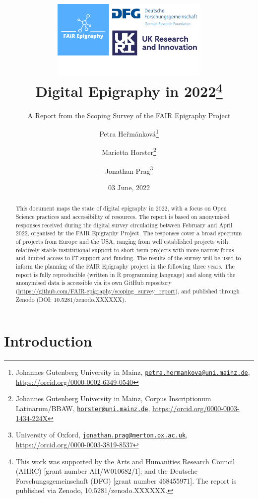 \documentclass[
  12pt,
]{scrreprt}
\title{\includegraphics[width=3in,height=\textheight]{../assets/banner.png}\\
Digital Epigraphy in 2022\footnote{This work was supported by the Arts
  and Humanities Research Council (AHRC) {[}grant number
  AH/W010682/1{]}; and the Deutsche Forschungsgemeinschaft (DFG)
  {[}grant number 468455971{]}. The report is published via Zenodo,
  10.5281/zenodo.XXXXXX.}}
\subtitle{A Report from the Scoping Survey of the FAIR Epigraphy
Project}
\author{Petra Heřmánková\footnote{Johannes Gutenberg University in
  Mainz,
  \href{mailto:petra.hermankova@uni.mainz.de}{\nolinkurl{petra.hermankova@uni.mainz.de}},
  \url{https://orcid.org/0000-0002-6349-0540}} \and Marietta
Horster\footnote{Johannes Gutenberg University in Mainz, Corpus
  Inscriptionum Latinarum/BBAW,
  \href{mailto:horster@uni.mainz.de}{\nolinkurl{horster@uni.mainz.de}},
  \url{https://orcid.org/0000-0003-1434-224X}} \and Jonathan
Prag\footnote{University of Oxford,
  \href{mailto:jonathan.prag@merton.ox.ac.uk}{\nolinkurl{jonathan.prag@merton.ox.ac.uk}},
  \url{https://orcid.org/0000-0003-3819-8537}}}
\date{03 June, 2022}
\begin{document}
\maketitle
\begin{abstract}
This document maps the state of digital epigraphy in 2022, with a focus
on Open Science practices and accessibility of resources. The report is
based on anonymised responses received during the digital survey
circulating between February and April 2022, organised by the FAIR
Epigraphy Project. The responses cover a broad spectrum of projects from
Europe and the USA, ranging from well established projects with
relatively stable institutional support to short-term projects with more
narrow focus and limited access to IT support and funding. The results
of the survey will be used to inform the planning of the FAIR Epigraphy
project in the following three years. The report is fully reproducible
(written in R programming language) and along with the anonymised data
is accessible via its own GitHub repository
(\url{https://github.com/FAIR-epigraphy/scoping_survey_report}), and
published through Zenodo (DOI: 10.5281/zenodo.XXXXXX).
\end{abstract}

{
\hypersetup{linkcolor=}
\setcounter{tocdepth}{2}
\tableofcontents
}
\hypertarget{introduction}{%
\chapter{Introduction}\label{introduction}}
\end{document}
